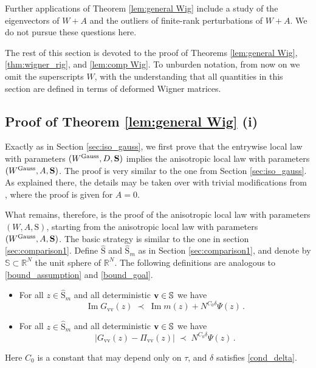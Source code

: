 \documentclass[11pt]{article} %
\numberwithin{equation}{section}
\numberwithin{figure}{section}
\theoremstyle{plain} %
\theoremstyle{definition} %
\newcommand{\f}[1]{\boldsymbol{\mathrm{#1}}} %
\newcommand{\bb}{\mathbb} %
\newcommand{\wh}{\widehat}
\newcommand{\txt}[1]{\text{\rm{#1}}}
\newcommand{\R}{\mathbb{R}}
\newcommand{\absb}[1]{\bigl\lvert #1 \bigr\rvert}
\DeclareMathOperator{\im}{Im}
\newcommand{\bv}{{\bf{v}}}
\begin{document}
Further applications of Theorem \ref{lem:general Wig} include a study of the eigenvectors of $W+A$ and the outliers of finite-rank perturbations of $W+A$. We do not pursue these questions here.

The rest of this section is devoted to the proof of Theorems \ref{lem:general Wig}, \ref{thm:wigner_rig}, and \ref{lem:comp Wig}. To unburden notation, from now on we omit the superscripts $W$, with the understanding that all quantities in this section are defined in terms of deformed Wigner matrices.



\subsection{Proof of Theorem \ref{lem:general Wig} (i)} \label{sec:Wigner_ll}

Exactly as in Section \ref{sec:iso_gauss}, we first prove that the entrywise local law with parameters $(W^{\txt{Gauss}}, D, \f S)$ implies the anisotropic local law with parameters $(W^{\txt{Gauss}}, A, \f S)$. The proof is very similar to the one from Section \ref{sec:iso_gauss}. As explained there, the details may be taken over with trivial modifications from \cite[Sections 5 and 7]{BEKYY}, where the proof is given for $A=0$.

What remains, therefore, is the proof of the anisotropic local law with parameters $(W, A, \f S)$, starting from the anisotropic local law with parameters $(W^{\txt{Gauss}}, A, \f S)$.
The basic strategy is similar to the one in section \ref{sec:comparison1}.  Define $\wh {\f S}$ and $\wh {\f S}_m$ as in Section \ref{sec:comparison1}, and denote by $\bb S \subset \R^N$ the unit sphere of $\R^N$. The following definitions are analogous to \eqref{bound_assumption} and \eqref{bound_goal}.
\begin{itemize}
\item[\textbf{($\f A_m$)}]
For all $z \in \wh{\f S}_m$ and all deterministic $\bv \in \bb S$ we have
\begin{equation} \label{bound_assumption_W}
\im G_{\f v \f v}(z) \;\prec\;  \im m(z) + N^{C_0 \delta} \Psi(z)\,.
\end{equation}

\item[\textbf{($\f C_m$)}]
For all $z \in \wh{\f S}_m$ and all deterministic $\bv \in \bb S$ we have
\begin{equation} \label{bound_goal_W}
\absb{G_{\f v \f v}(z) - \Pi_{\f v \f v}(z)} \;\prec\; N^{C_0 \delta} \Psi(z)\,.
\end{equation}
\end{itemize}
Here $C_0$ is a constant that may depend only on $\tau$, and $\delta$ satisfies \eqref{cond_delta}.
\end{document}
